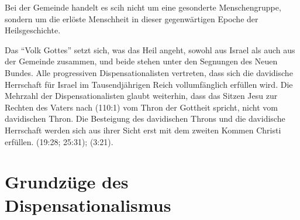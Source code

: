 \documentclass{../../inc/mybib}
\begin{document}
\begin{enumerate}
    Bei der Gemeinde handelt es scih nicht um eine gesonderte Menschengruppe, sondern um die erlöste Menschheit in dieser gegenwärtigen Epoche der Heilsgeschichte. 
    
    Das \enquote{Volk Gottes} setzt sich, was das Heil angeht, sowohl aus Israel als auch aus der Gemeinde zusammen, und beide stehen unter den Segnungen des Neuen Bundes. Alle progressiven Dispensationalisten vertreten, dass sich die davidische Herrschaft für Israel im Tausendjährigen Reich vollumfänglich erfüllen wird. Die Mehrzahl der Dispensationalisten glaubt weiterhin, dass das Sitzen Jesu zur Rechten des Vaters nach (110:1) vom Thron der Gottheit spricht, nicht vom davidischen Thron. Die Besteigung des davidischen Throns und die davidische Herrschaft werden sich aus ihrer Sicht erst mit dem zweiten Kommen Christi erfüllen. (19:28; 25:31); (3:21).
\end{enumerate}
\section{Grundzüge des Dispensationalismus}
\end{document}
